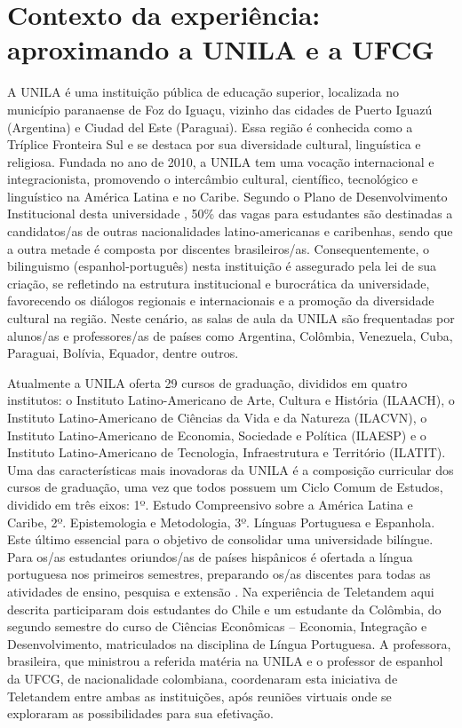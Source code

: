 \documentclass[portuguese]{textolivre}
\begin{document}
\section{Contexto da experiência: aproximando a UNILA e a UFCG}

A UNILA é uma instituição pública de educação superior, localizada no município paranaense de Foz do Iguaçu, vizinho das cidades de Puerto Iguazú (Argentina) e Ciudad del Este (Paraguai). Essa região é conhecida como a Tríplice Fronteira Sul e se destaca por sua diversidade cultural, linguística e religiosa. Fundada no ano de 2010, a UNILA tem uma vocação internacional e integracionista, promovendo o intercâmbio cultural, científico, tecnológico e linguístico na América Latina e no Caribe. Segundo o Plano de Desenvolvimento Institucional desta universidade \cite{Universidade2019}, 50\% das vagas para estudantes são destinadas a candidatos/as de outras nacionalidades latino-americanas e caribenhas, sendo que a outra metade é composta por discentes brasileiros/as. Consequentemente, o bilinguismo (espanhol-português) nesta instituição é assegurado pela lei de sua criação, se refletindo na estrutura institucional e burocrática da universidade, favorecendo os diálogos regionais e internacionais e a promoção da diversidade cultural na região. Neste cenário, as salas de aula da UNILA são frequentadas por alunos/as e professores/as de países como Argentina, Colômbia, Venezuela, Cuba, Paraguai, Bolívia, Equador, dentre outros. 

Atualmente a UNILA oferta 29 cursos de graduação, divididos em quatro institutos: o Instituto Latino-Americano de Arte, Cultura e História (ILAACH), o Instituto Latino-Americano de Ciências da Vida e da Natureza (ILACVN), o Instituto Latino-Americano de Economia, Sociedade e Política (ILAESP) e o Instituto Latino-Americano de Tecnologia, Infraestrutura e Território (ILATIT). Uma das características mais inovadoras da UNILA é a composição curricular dos cursos de graduação, uma vez que todos possuem um Ciclo Comum de Estudos, dividido em três eixos: 1º. Estudo Compreensivo sobre a América Latina e Caribe, 2º. Epistemologia e Metodologia, 3º. Línguas Portuguesa e Espanhola. Este último essencial para o objetivo de consolidar uma universidade bilíngue. Para os/as estudantes oriundos/as de países hispânicos é ofertada a língua portuguesa nos primeiros semestres, preparando os/as discentes para todas as atividades de ensino, pesquisa e extensão \cite{Universidade2019}. Na experiência de Teletandem aqui descrita participaram dois estudantes do Chile e um estudante da Colômbia, do segundo semestre do curso de Ciências Econômicas – Economia, Integração e Desenvolvimento, matriculados na disciplina de Língua Portuguesa. A professora, brasileira, que ministrou a referida matéria na UNILA e o professor de espanhol da UFCG, de nacionalidade colombiana, coordenaram esta iniciativa de Teletandem entre ambas as instituições, após reuniões virtuais onde se exploraram as possibilidades para sua efetivação. 
\end{document}
